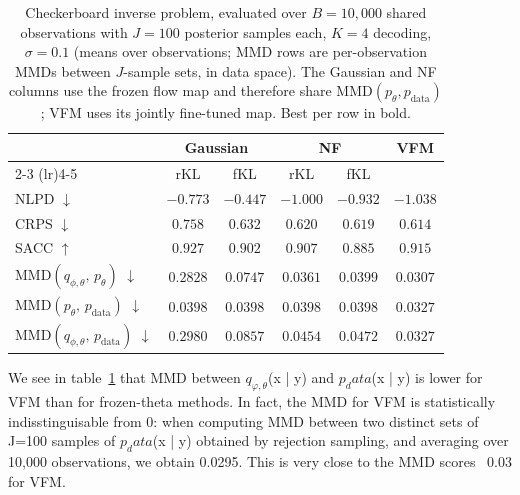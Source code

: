 \documentclass[12pt,a4paper]{report}
\begin{document}
\begin{table}[t]
\centering
\small
\setlength{\tabcolsep}{5pt}
\begin{tabular}{l cc cc c}
\toprule
 & \multicolumn{2}{c}{Gaussian} & \multicolumn{2}{c}{NF} & \multirow{2}{*}{VFM} \\
\cmidrule(lr){2-3} \cmidrule(lr){4-5}
 & rKL & fKL & rKL & fKL & \\
\midrule
NLPD $\downarrow$ & $-0.773$ & $-0.447$ & $-1.000$ & $-0.932$ & $\mathbf{-1.038}$ \\
CRPS $\downarrow$ & $0.758$ & $0.632$ & $0.620$ & $0.619$ & $\mathbf{0.614}$ \\
SACC $\uparrow$ & $\mathbf{0.927}$ & $0.902$ & $0.907$ & $0.885$ & $0.915$ \\
$\mathrm{MMD}(q_{\phi,\theta},\, p_\theta)$ $\downarrow$ & $0.2828$ & $0.0747$ & $0.0361$ & $0.0399$ & $\mathbf{0.0307}$ \\
$\mathrm{MMD}(p_\theta,\, p_\text{data})$ $\downarrow$ & $0.0398$ & $0.0398$ & $0.0398$ & $0.0398$ & $\mathbf{0.0327}$ \\
$\mathrm{MMD}(q_{\phi,\theta},\, p_\text{data})$ $\downarrow$ & $0.2980$ & $0.0857$ & $0.0454$ & $0.0472$ & $\mathbf{0.0327}$ \\
\bottomrule
\end{tabular}
\caption{Checkerboard inverse problem, evaluated over $B=10{,}000$ shared
observations with $J=100$ posterior samples each, $K=4$ decoding, $\sigma=0.1$
(means over observations; MMD rows are per-observation MMDs between
$J$-sample sets, in data space). The Gaussian and NF columns use the frozen
flow map and therefore share $\mathrm{MMD}(p_\theta, p_\text{data})$; VFM uses
its jointly fine-tuned map. Best per row in bold.}
\label{tab:checkerboard_results}
\end{table}

We see in table~\ref{tab:checkerboard_results} that MMD between $q_{φ,θ}$(x | y) and $p_data$(x | y) is lower for VFM than for frozen-theta methods. 
In fact, the MMD for VFM is statistically indisstinguisable from 0: when computing MMD between two distinct sets of J=100 samples of $p_data$(x | y) obtained by rejection sampling, and averaging over 10,000 observations, we obtain 0.0295. 
This is very close to the MMD scores ~0.03 for VFM. 
\end{document}
